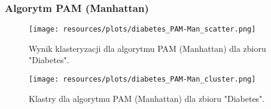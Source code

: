   \subsubsection{Algorytm PAM (Manhattan)} 
    \begin{figure}[H]
      \center
      \texttt{[image: resources/plots/diabetes\_PAM-Man\_scatter.png]}
      \caption{Wynik klasteryzacji dla algorytmu PAM (Manhattan) dla zbioru "Diabetes".}
    \end{figure}
    \begin{figure}[H]
      \center
      \texttt{[image: resources/plots/diabetes\_PAM-Man\_cluster.png]}
      \caption{Klastry dla algorytmu PAM (Manhattan) dla zbioru "Diabetes".}
    \end{figure}
